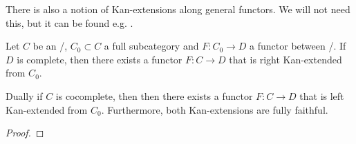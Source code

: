 \begin{remark}
    There is also a notion of Kan-extensions along general functors. 
    We will not need this, but it can be found e.g. %
    .
\end{remark}
\begin{prop} %
    Let $C$ be an \inftycat/, $C_0\subset C$ a full subcategory and $F\colon C_0\to D$ a functor between \inftycats/.
    If $D$ is complete, then there exists a functor $F\colon C\to D$ that is right Kan-extended from $C_0$.

    Dually if $C$ is cocomplete, then then there exists a functor $F\colon C\to D$ that is left Kan-extended from $C_0$.
    Furthermore, both Kan-extensions are fully faithful.
    \begin{proof}
    \end{proof}
\end{prop}
